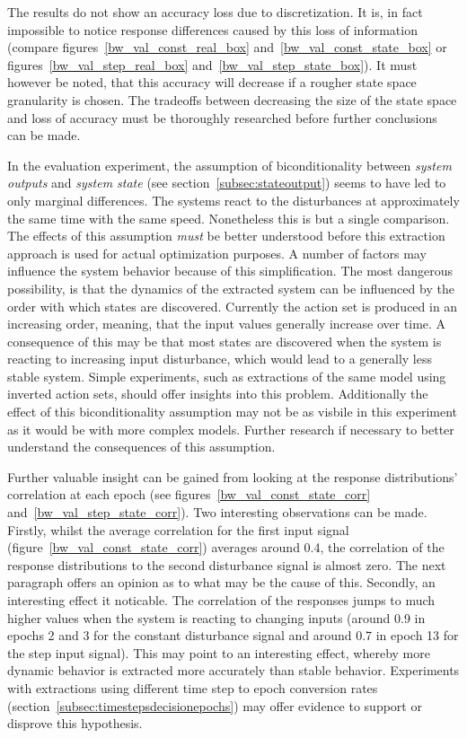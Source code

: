 The results do not show an accuracy loss due to discretization. It is, in fact impossible to notice response differences caused by this loss of information (compare figures~\ref{bw_val_const_real_box} and~\ref{bw_val_const_state_box} or figures~\ref{bw_val_step_real_box} and~\ref{bw_val_step_state_box}). It must however be noted, that this accuracy will decrease if a rougher state space granularity is chosen. The tradeoffs between decreasing the size of the state space and loss of accuracy must be thoroughly researched before further conclusions can be made.

In the evaluation experiment, the assumption of biconditionality between \textit{system outputs} and \textit{system state} (see section~\ref{subsec:stateoutput}) seems to have led to only marginal differences. The systems react to the disturbances at approximately the same time with the same speed. Nonetheless this is but a single comparison. The effects of this assumption \textit{must} be better understood before this extraction approach is used for actual optimization purposes. A number of factors may influence the system behavior because of this simplification. The most dangerous possibility, is that the dynamics of the extracted system can be influenced by the order with which states are discovered. Currently the action set is produced in an increasing order, meaning, that the input values generally increase over time. A consequence of this may be that most states are discovered when the system is reacting to increasing input disturbance, which would lead to a generally less stable system. Simple experiments, such as extractions of the same model using inverted action sets, should offer insights into this problem. Additionally the effect of this biconditionality assumption may not be as visbile in this experiment as it would be with more complex models. Further research if necessary to better understand the consequences of this assumption.

Further valuable insight can be gained from looking at the response distributions' correlation at each epoch (see figures~\ref{bw_val_const_state_corr} and~\ref{bw_val_step_state_corr}). Two interesting observations can be made. Firstly, whilst the average correlation for the first input signal (figure~\ref{bw_val_const_state_corr}) averages around 0.4, the correlation of the response distributions to the second disturbance signal is almost zero. The next paragraph offers an opinion as to what may be the cause of this. Secondly, an interesting effect it noticable. The correlation of the responses jumps to much higher values when the system is reacting to changing inputs (around 0.9 in epochs 2 and 3 for the constant disturbance signal and around 0.7 in epoch 13 for the step input signal). This may point to an interesting effect, whereby more dynamic behavior is extracted more accurately than stable behavior. Experiments with extractions using different time step to epoch conversion rates (section~\ref{subsec:timestepsdecisionepochs}) may offer evidence to support or disprove this hypothesis.

